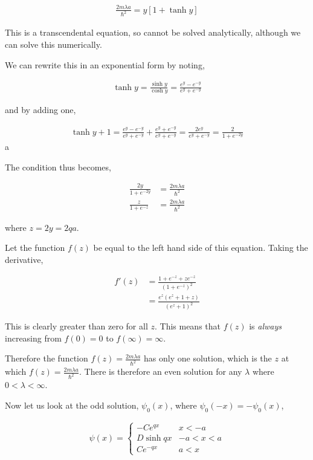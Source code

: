 \documentclass[11pt]{amsart}
\begin{document}
\begin{align*}
  \frac{2m\lambda a}{\hbar^2} = y\left[1 + \tanh{y}\right]
\end{align*}

This is a transcendental equation, so cannot be solved analytically, although we can solve this numerically.

We can rewrite this in an exponential form by noting,

\begin{align*}
  \tanh{y} = \frac{\sinh{y}}{\cosh{y}} = \frac{e^y - e^{-y}}{e^y + e^{-y}}
\end{align*}

and by adding one,

\begin{align*}
  \tanh y + 1 = \frac{e^y - e^{-y}}{e^y + e^{-y}} + \frac{e^y + e^{-y}}{e^y + e^{-y}} = \frac{2e^y}{e^y + e^{-y}} = \frac{2}{1 + e^{-2y}}
\end{align*}a

The condition thus becomes,

\begin{align*}
  \frac{2y}{1 + e^{-2y}} &= \frac{2m\lambda a}{\hbar^2} \\
  \frac{z}{1 + e^{-z}} &= \frac{2m\lambda a}{\hbar^2}
\end{align*}

where $z = 2y = 2qa$.

Let the function $f(z)$ be equal to the left hand side of this equation. Taking the derivative,

\begin{align*}
  f'(z) &= \frac{1 + e^{-z} + ze^{-z}}{{\left(1 + e^{-z}\right)}^2} \\
        &= \frac{e^z\left(e^z + 1 + z\right)}{{\left(e^z + 1\right)}^2}
\end{align*}

This is clearly greater than zero for all $z$. This means that $f(z)$ is \textit{always} increasing from $f(0) = 0$ to $f(\infty) = \infty$.

Therefore the function $f(z) = \frac{2m\lambda a}{\hbar^2}$ has only one solution, which is the $z$ at which $f(z) = \frac{2m\lambda a}{\hbar^2}$. There is therefore an even solution for any $\lambda$ where $0 < \lambda < \infty$.

Now let us look at the odd solution, $\psi_0(x)$, where $\psi_0(-x) = -\psi_0(x)$,

\begin{align*}
  \psi(x) =
  \begin{cases}
    -Ce^{qx} & x < -a \\
    D\sinh{qx} & -a < x < a \\
    Ce^{-qx} & a < x
  \end{cases}
\end{align*}
\end{document}
